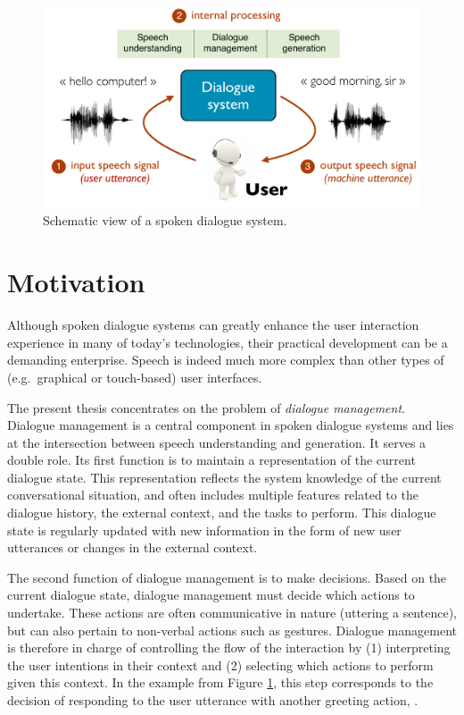 \begin{figure}[ht]
\center
\includegraphics[scale=0.46]{imgs/basicsds.pdf}
\caption{Schematic view of a spoken dialogue system.}
\label{fig:basicsds}
\end{figure}

\section{Motivation}

Although spoken dialogue systems can greatly enhance the user interaction experience in many of today's technologies, their practical development can be a demanding enterprise. Speech is indeed much more complex than other types of (e.g.\ graphical or touch-based) user interfaces.

The present thesis concentrates on the problem of \textit{dialogue management}.  Dialogue management is a central component in spoken dialogue systems and lies at the intersection between speech understanding and generation.  It serves a double role. Its first function is to maintain a representation of the current dialogue state. This representation reflects the system knowledge of the current conversational situation, and often includes multiple features related to the dialogue history, the external context, and the tasks to perform.  This dialogue state is regularly updated with new information in the form of new user utterances or changes in the external context. 

The second function of dialogue management is to make decisions.  Based on the current dialogue state, dialogue management must decide which actions to undertake. These actions are often communicative in nature (uttering a sentence), but can also pertain to non-verbal actions such as gestures.  Dialogue management is therefore in charge of controlling the flow of the interaction by (1) interpreting the user intentions in their context and (2) selecting which actions to perform given this context. In the example from Figure \ref{fig:basicsds}, this step corresponds to the decision of responding to the user utterance  with another greeting action, . 


